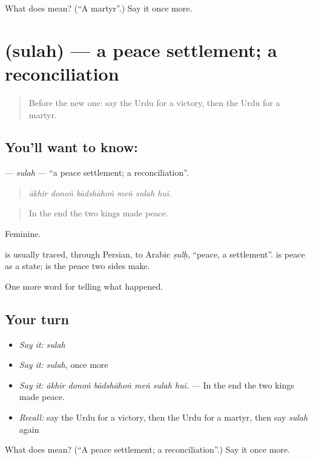 \begin{tcolorbox}[breakable,colback=teal!4,colframe=teal!35!black,title={Before you move on}]
What does  mean? (\textquotedblleft{}A martyr\textquotedblright{}.) Say it once more.
\end{tcolorbox}
\section[\texorpdfstring{\ur{صلح} (sulah)}{صلح (sulah)}]{ (sulah) — a peace settlement; a reconciliation}

\label{lesson:UR-C311-sulah}



\begin{quote}
Before the new one: say the Urdu for a victory, then the Urdu for a martyr.
\end{quote}

\subsection*{You'll want to know: }
\textbf{} — \emph{sulah} — \textquotedblleft{}a peace settlement; a reconciliation\textquotedblright{}.

\begin{quote}
     
\end{quote}

\begin{quote}
\emph{ākhir donoṅ bādshāhoṅ meṅ sulah huī.}
\end{quote}

\begin{quote}
In the end the two kings made peace.
\end{quote}

Feminine.

\begin{cousinweb}
is usually traced, through Persian, to Arabic \emph{ṣulḥ}, \textquotedblleft{}peace, a settlement\textquotedblright{}. \textbf{} is peace as a state; \textbf{} is the peace two sides make.
\end{cousinweb}

\begin{grammarlens}[title={What you've built}]
One more word for telling what happened.
\end{grammarlens}

\subsection*{Your turn}
\begin{itemize}
\raggedright
  \item \emph{Say it:} \emph{sulah}
  \item \emph{Say it:} \emph{sulah}, once more
  \item \emph{Say it:} \emph{ākhir donoṅ bādshāhoṅ meṅ sulah huī.} — In the end the two kings made peace.
  \item \emph{Recall:} say the Urdu for a victory, then the Urdu for a martyr, then say \emph{sulah} again
\end{itemize}

\begin{tcolorbox}[breakable,colback=teal!4,colframe=teal!35!black,title={Before you move on}]
What does  mean? (\textquotedblleft{}A peace settlement; a reconciliation\textquotedblright{}.) Say it once more.
\end{tcolorbox}
